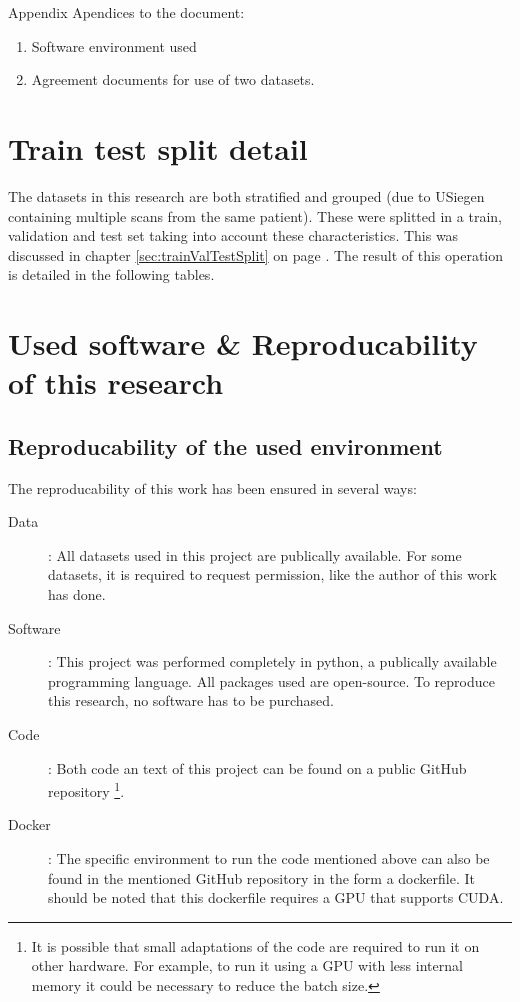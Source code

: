\appendix

\begin{partwithabstract}{Appendix}
  Apendices to the document:
  \begin{enumerate}
    \item Software environment used
    \item Agreement documents for use of two datasets.
  \end{enumerate}
\end{partwithabstract}
\restoregeometry

\chapter{Train test split detail\label{sec:appendix_split}}

The datasets in this research are both stratified and grouped (due to USiegen containing multiple scans from the same patient).
These were splitted in a train, validation and test set taking into account these characteristics.
This was discussed in chapter \ref{sec:trainValTestSplit} on page \pageref{sec:trainValTestSplit}.
The result of this operation is detailed in the following tables.




\chapter{Used software \& Reproducability of this research}

\section{Reproducability of the used environment}
The reproducability of this work has been ensured in several ways:
\begin{description}
  \item[Data]: All datasets used in this project are publically available. For some datasets, it is required to request permission, like the author of this work has done.
  \item[Software]: This project was performed completely in python, a publically available programming language. 
  All packages used are open-source.
  To reproduce this research, no software has to be purchased. 
  \item[Code]: Both code an text of this project can be found on a public GitHub repository
  \footnote{It is possible that small adaptations of the code are required to run it on other hardware. For example, to run it using a GPU with less internal memory it could be necessary to reduce the batch size.}. 
  \item[Docker]: The specific environment to run the code mentioned above can also be found in the mentioned GitHub repository in the form a dockerfile.
  It should be noted that this dockerfile requires a GPU that supports CUDA.   
\end{description}

